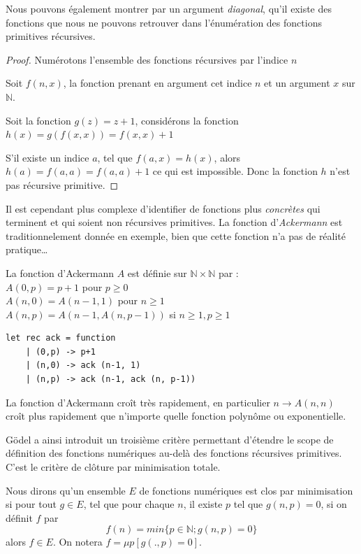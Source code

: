 \documentclass[11pt]{book}
\begin{document}
Nous pouvons également montrer par un  argument \textit{diagonal}, qu'il existe des fonctions que nous ne 
pouvons retrouver dans l'énumération des fonctions primitives récursives.
\begin{proof}
	Numérotons l'ensemble des fonctions récursives par l'indice $n$

	Soit $f(n,x)$, la fonction prenant en argument cet indice $n$ et un argument $x$ sur $\mathbb{N}$.
       
	Soit la fonction $g(z)=z+1$, considérons la fonction $h(x)=g(f(x,x))=f(x,x)+1$

        S'il existe un indice $a$, tel que $f(a,x)=h(x)$, alors $h(a)=f(a,a)=f(a,a)+1$ ce qui est 
	impossible. Donc la fonction $h$ n'est pas récursive primitive.

\end{proof}

Il est cependant plus complexe d'identifier de fonctions plus \textit{concrètes}
 qui terminent et qui soient non récursives primitives.
La fonction d'\textit{Ackermann} est traditionnelement donnée en exemple, bien que cette fonction n'a pas
de réalité pratique\dots

La fonction d’Ackermann $A$ est définie sur $\mathbb{N} × \mathbb{N}$ par : \\
$A(0, p) = p + 1$ pour $p ≥ 0$ \\
$A(n, 0) = A(n − 1, 1)$ pour $n ≥ 1$ \\
$A(n, p) = A(n − 1, A(n, p − 1))$ si $n ≥ 1, p ≥ 1$ \\ 

\begin{Verbatim}
let rec ack = function
	| (0,p) -> p+1
	| (n,0) -> ack (n-1, 1)
	| (n,p) -> ack (n-1, ack (n, p-1))
\end{Verbatim}

La fonction d’Ackermann croît très rapidement, en particulier $n \rightarrow A(n, n)$ croît
plus rapidement que n’importe quelle fonction polynôme ou exponentielle.

Gödel a ainsi introduit un troisième critère permettant d'étendre le scope de définition des
fonctions numériques au-delà des fonctions récursives primitives. C'est le critère
de clôture par minimisation totale.

Nous dirons qu'un ensemble $E$ de fonctions numériques est clos par minimisation si
pour tout $g \in E$, tel que pour chaque $n$, il existe $p$ tel que $g(n,p)=0$, si on définit
$f$ par
$$ f(n) = min\{p\in \mathbb{N} ; g(n,p) = 0   \} $$
alors $f\in E$. On notera $f =\mu p [g(.,p)=0]$.
\end{document}

